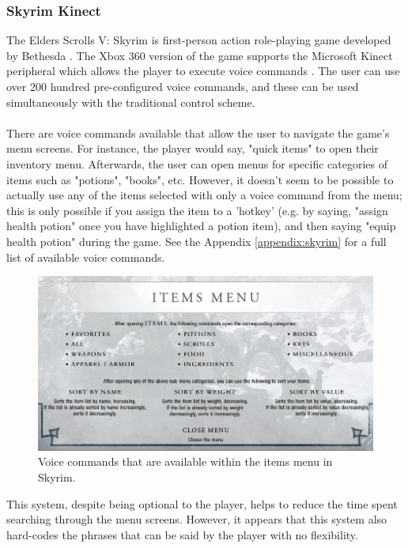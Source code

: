 \documentclass[11pt]{article}
\begin{document}
\subsubsection{Skyrim Kinect}
The Elders Scrolls V: Skyrim is first-person action role-playing game developed by Bethesda \cite{RefWorks:23}. The Xbox 360 version of the game supports the Microsoft Kinect peripheral which allows the player to execute voice commands \cite{RefWorks:24}. The user can use over 200 hundred pre-configured voice commands, and these can be used simultaneously with the traditional control scheme.
\\
\\
There are voice commands available that allow the user to navigate the game's menu screens. For instance, the player would say, "quick items" to open their inventory menu. Afterwards, the user can open menus for specific categories of items such as "potions", "books", etc. However, it doesn't seem to be possible to actually use any of the items selected with only a voice command from the menu; this is only possible if you assign the item to a 'hotkey' (e.g. by saying, "assign health potion" once you have highlighted a potion item), and then saying "equip health potion" during the game. See the Appendix \ref{appendix:skyrim} for a full list of available voice commands.
\begin{center}
\begin{figure}[H]
  \includegraphics[width=\textwidth]{skyrim-item-commands.png}
  \caption{Voice commands that are available within the items menu in Skyrim.}
\end{figure}
\end{center}
This system, despite being optional to the player, helps to reduce the time spent searching through the menu screens. However, it appears that this system also hard-codes the phrases that can be said by the player with no flexibility.
\end{document}
